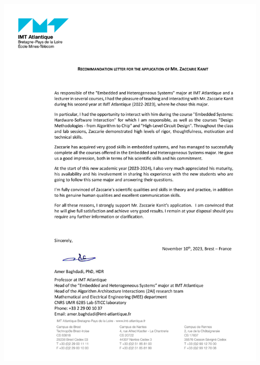 \documentclass[a4paper, 10pt]{article}
\begin{document}
\if{}
\newpage
\includegraphics[width= 0.95\columnwidth]{images/recommandation_lettre_Zaccarie_Kanit_from_Amer_Baghdadi.png}
\fi
\end{document}
